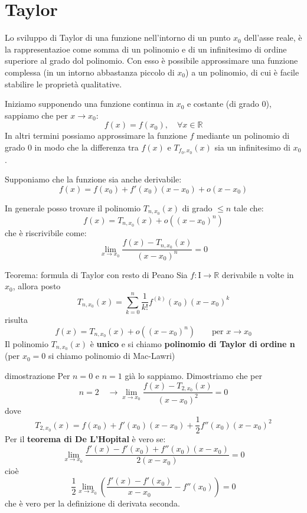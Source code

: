 \documentclass[x11names]{article}
\begin{document}
	\newpage
	\section{Taylor}
	Lo sviluppo di Taylor di una funzione nell'intorno di un punto $x_0$ dell'asse reale, è la rappresentazioe come somma di un polinomio e di un infinitesimo di ordine superiore al grado dol polinomio. Con esso è possibile approssimare una funzione complessa (in un intorno abbastanza piccolo di $x_0$) a un polinomio, di cui è facile stabilire le proprietà qualitative.
	
	Iniziamo supponendo una funzione continua in $x_0$ e costante (di grado 0), sappiamo che per $x\to x_0$:
	\[
	f(x) = f(x_0), \quad \forall x \in \mathbb{R}
	\]
	In altri termini possiamo approssimare la funzione $f$ mediante un polinomio di grado 0 in modo che la differenza tra $f(x)$ e $T_{f_0,x_0}(x)$ sia un infinitesimo di $x_0$.
	
	Supponiamo che la funzione sia anche derivabile:
	\[
	f(x) = f(x_0) + f'(x_0)(x-x_0) + o(x-x_0)
	\]
	
	In generale posso trovare il polinomio $T_{n,x_0}(x)$ di grado $\leq n$ tale che:
	\[
	f(x) = T_{n,x_0}(x) + o\left( (x-x_0)^n\right)
	\]
	che è riscrivibile come:
	\[
	\lim_{x\to x_0}\frac{f(x) - T_{n,x_0}(x)}{(x-x_0)^n} = 0
	\]
	\begin{center}
		\colorbox{myred}{\begin{minipage}{5.75in}
				\begin{redes}{Teorema: formula di Taylor con resto di Peano}
					Sia $f:$I$\to \mathbb{R}$ derivabile n volte in $x_0$, allora posto
					\[
					T_{n,x_0}(x) = \sum_{k=0}^{n}\frac{1}{k!}f^{(k)}(x_0)(x-x_0)^k
					\]
					risulta
					\[
					f(x) = T_{n,x_0}(x) + o\left( (x-x_0)^n\right) \qquad \text{per }x \to x_0
					\]
					Il polinomio $T_{n,x_0}(x)$ è \textbf{unico} e si chiamo \textbf{polinomio di Taylor di ordine n} (per $x_0 = 0$ si chiamo polinomio di Mac-Lawri)
				\end{redes} 
		\end{minipage}}        
	\end{center}
	\begin{es}{dimostrazione}
		Per $n=0$ e $n=1$ già lo sappiamo. Dimostriamo che per 
		\[
		n = 2 \quad \to \lim_{x\to x_0}\frac{f(x) - T_{2,x_0}(x)}{(x-x_0)^2} = 0
		\]
		dove
		\[
		T_{2,x_0}(x) = f(x_0) + f'(x_0)(x-x_0) + \frac{1}{2}f''(x_0)(x-x_0)^2
		\]
		Per il \textbf{teorema di De L'Hopital} è vero se:
		\[
		\lim_{x\to x_0}\frac{f'(x) - f'(x_0)+f''(x_0)(x-x_0)}{2(x-x_0)} = 0
		\]
		cioè
		\[
		\frac{1}{2}\lim_{x\to x_0}\left( \frac{f'(x) - f'(x_0)}{x-x_0} - f''(x_0)\right) = 0
		\]
		che è vero per la definizione di derivata seconda.
	\end{es}
	
\end{document}
